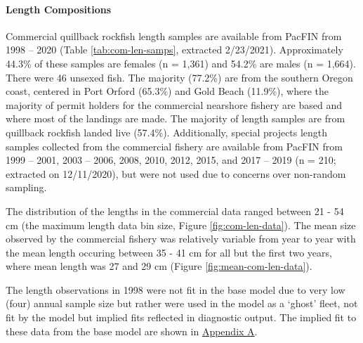 \documentclass[11pt,
  english,
  a4paper,
]{article}
\begin{document}
\leavevmode\tagmcend\tagstructend\par


\hypertarget{length-compositions}{%
\paragraph{Length Compositions}\label{length-compositions}}

\leavevmode\tagmcend\tagstructend


Commercial quillback rockfish length samples are available from PacFIN from 1998 -- 2020 (Table \ref{tab:com-len-samps}, extracted 2/23/2021). Approximately 44.3\% of these samples are females (n = 1,361) and 54.2\% are males (n = 1,664). There were 46 unsexed fish. The majority (77.2\%) are from the southern Oregon coast, centered in Port Orford (65.3\%) and Gold Beach (11.9\%), where the majority of permit holders for the commercial nearshore fishery are based and where most of the landings are made. The majority of length samples are from quillback rockfish landed live (57.4\%). Additionally, special projects length samples collected from the commercial fishery are available from PacFIN from 1999 -- 2001, 2003 -- 2006, 2008, 2010, 2012, 2015, and 2017 -- 2019 (n = 210; extracted on 12/11/2020), but were not used due to concerns over non-random sampling.

\leavevmode\tagmcend\tagstructend\par


The distribution of the lengths in the commercial data ranged between 21 - 54 cm (the maximum length data bin size, Figure \ref{fig:com-len-data}). The mean size observed by the commercial fishery was relatively variable from year to year with the mean length occuring between 35 - 41 cm for all but the first two years, where mean length was 27 and 29 cm (Figure \ref{fig:mean-com-len-data}).

\leavevmode\tagmcend\tagstructend\par


The length observations in 1998 were not fit in the base model due to very low (four) annual sample size but rather were used in the model as a `ghost' fleet, not fit by the model but implied fits reflected in diagnostic output. The implied fit to these data from the base model are shown in {\protect\hyperlink{append_a}{Appendix A}\leavevmode\tagmcend\tagstructend}.
\end{document}

